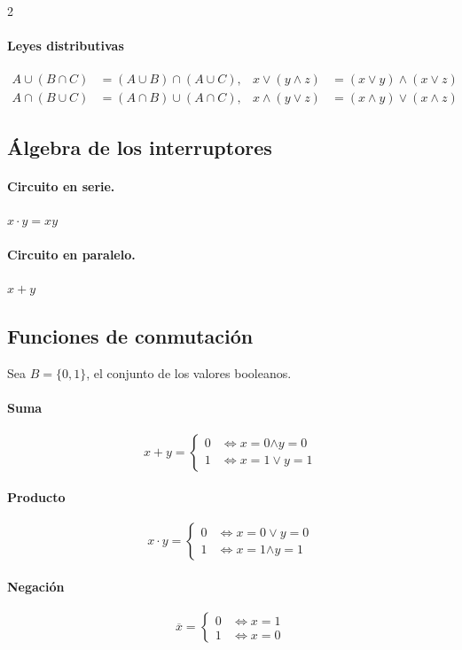 \documentclass[11pt,a4paper]{article}   %
\begin{document}
\begin{paracol}{2}
\paragraph{Leyes distributivas}
\begin{align*}
A \cup (B \cap C) &= (A \cup B) \cap (A \cup C), & x \lor (y \land z) &= (x \lor y) \land (x \lor z) \\
A \cap (B \cup C) &= (A \cap B) \cup (A \cap C), & x \land (y \lor z) &= (x \land y) \lor (x \land z)
\end{align*}
\end{paracol}


\subsection{Álgebra de los interruptores}
\paragraph{Circuito en serie.} $x \cdot y = xy$
\paragraph{Circuito en paralelo.} $x + y$

\subsection{Funciones de conmutación}
Sea $B = \{0, 1\}$, el conjunto de los valores booleanos.

\paragraph{Suma} $$x + y = \begin{cases}
0 & \Leftrightarrow x = 0 \boldsymbol{\land} y = 0 \\
1 & \Leftrightarrow x = 1 \lor y = 1
\end{cases}$$

\paragraph{Producto} $$x \cdot y = \begin{cases}
0 & \Leftrightarrow x = 0 \lor y = 0 \\
1 & \Leftrightarrow x = 1 \boldsymbol{\land} y = 1
\end{cases}$$

\paragraph{Negación} $$\overline{x} = \begin{cases}
0 & \Leftrightarrow x = 1 \\
1 & \Leftrightarrow x = 0
\end{cases}$$
\end{document}
